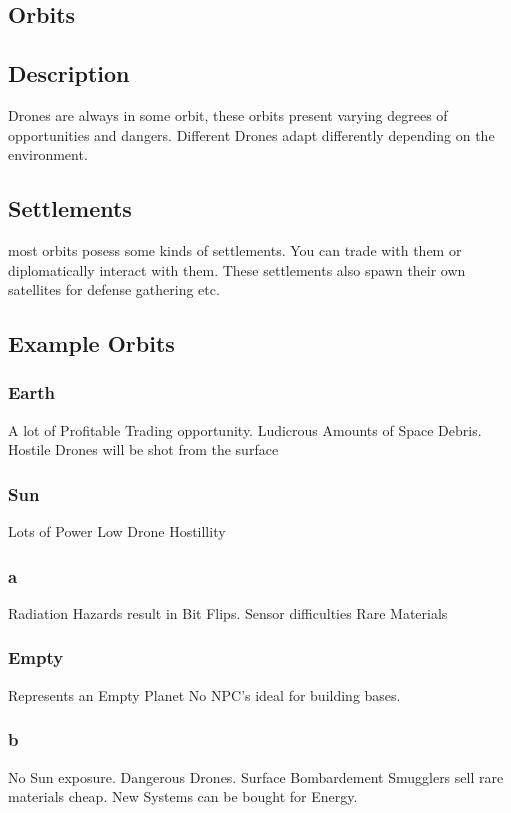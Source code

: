\documentclass[a4paper]{scrreprt}
\begin{document}
\begin{alpha-feature}  
    \chapter{Orbits}
        \section{Description}
            Drones are always in some orbit, these orbits present varying degrees of opportunities and dangers.
            Different Drones adapt differently depending on the environment. 
        \section{Settlements}
            most orbits posess some kinds of settlements. You can trade with them or diplomatically interact with them. These settlements also spawn their own satellites for defense gathering etc.
        \section{Example Orbits}
            \subsection{Earth}
                A lot of Profitable Trading opportunity.
                Ludicrous Amounts of Space Debris.
                Hostile Drones will be shot from the surface
            \subsection{Sun}
                Lots of Power 
                Low Drone Hostillity 
            \subsection{a}
                Radiation Hazards result in Bit Flips.
                Sensor difficulties
                Rare Materials
            \subsection{Empty}
               Represents an Empty Planet 
               No NPC's
               ideal for building bases.
            \subsection{b}
                No Sun exposure.
                Dangerous Drones.
                Surface Bombardement
                Smugglers sell rare materials cheap.
                New Systems can be bought for Energy.

\end{alpha-feature}
\end{document}

